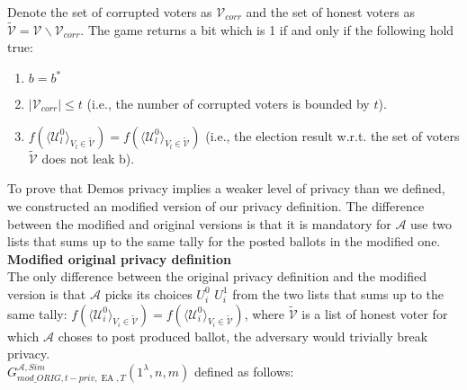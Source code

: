 \documentclass[12pt]{article}
\DeclareMathOperator{\ea}{EA}
\begin{document}
Denote the set of corrupted voters as $\mathcal{V}_{corr}$ and the set of honest voters as $\tilde{\mathcal{V}}= \mathcal{V} \backslash \mathcal{V}_{corr}$. The game returns a bit which is 1 if and only if the following hold true:
\begin{enumerate}
 \item $b = b^*$
 \item $|\mathcal{V}_{corr}| \leq t$ (i.e., the number of corrupted voters is bounded by $t$).
 \item $f(\langle \mathcal{U}^0_l \rangle _{V_l \in \tilde{\mathcal{V}}} ) = f(\langle \mathcal{U}^0_l \rangle _{V_l \in \tilde{\mathcal{V}}})$ (i.e., the election result w.r.t. the set of voters  $\tilde{\mathcal{V}}$ does not leak b).
\end{enumerate} 
To prove that Demos privacy implies a weaker level of privacy than we defined, we constructed an modified version of our privacy definition. The difference between the modified and original versions is that it is mandatory for  $\mathcal{A}$ use two lists that sums up to the same tally for the posted ballots in the modified one.\\
 
\textbf{Modified original privacy definition}\\ 

The only difference between the original privacy definition and the modified version is that $\mathcal{A}$ picks its choices $U^0_i$ $U^1_i$ from the two lists that sums up to the same tally: $f(\langle \mathcal{U}^0_i \rangle _{V_i \in \tilde{\mathcal{V}}} ) = f(\langle \mathcal{U}^0_i \rangle _{V_i \in \tilde{\mathcal{V}}})$, where $ \tilde{\mathcal{V}}$ is a list of honest voter for which $\mathcal{A}$ choses to post produced ballot, the adversary would trivially break privacy. \\ 

$G_{mod\_ORIG,t-priv,\ea,T}^{\mathcal{A}, Sim}(1^{\lambda},n,m)$ defined as follows:\\
\end{document}
